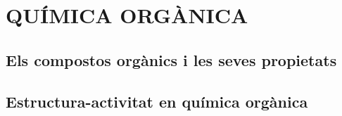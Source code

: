 \chapter{QUÍMICA ORGÀNICA}

\section{Els compostos orgànics i les seves propietats}
\section{Estructura-activitat en química orgànica}
